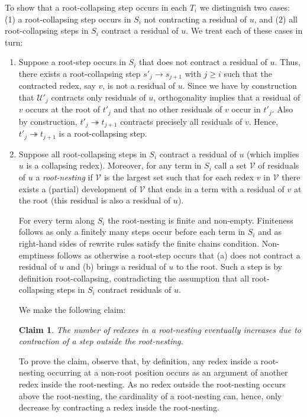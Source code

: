 \documentclass{LMCS}
\theoremstyle{plain}
\newtheorem{claim}{Claim}
\theoremstyle{definition}
\newcommand{\rew}{\rightarrow}
\newcommand{\trewt}{\twoheadrightarrow}
\begin{document}
To show that a root-collapsing step occurs in each $T_i$ we distinguish
two cases: (1) a root-collapsing step occurs in $S_i$ not
contracting a residual of $u$, and (2) all root-collapsing steps in $S_i$
contract a residual of $u$. We treat each of these cases in turn:
\begin{enumerate}[(1)]
\item
Suppose a root-step occurs in $S_i$ that does not contract a residual of $u$. Thus, there exists a root-collapsing step $s'_j \rew s_{j + 1}$ with $j \geq i$ such that the contracted redex, say $v$, is not a residual of $u$. Since we have by construction that $\mathcal{U}'_j$ contracts only residuals of $u$, orthogonality implies that a residual of $v$ occurs at the root of $t'_j$ and that no other residuals of $v$ occur in $t'_j$. Also by construction, $t'_j \trewt t_{j + 1}$ contracts precisely all residuals of $v$. Hence, $t'_j \trewt t_{j + 1}$ is a root-collapsing step.
\item
Suppose all root-collapsing steps in $S_i$ contract a residual of $u$ (which implies $u$ is a collapsing redex). Moreover, for any term in $S_i$ call a set $\mathcal{V}$ of residuals of $u$ a \emph{root-nesting} if $\mathcal{V}$ is the largest set such that for each redex $v$ in $\mathcal{V}$ there exists a (partial) development of $\mathcal{V}$ that ends in a term with a residual of $v$ at the root (this residual is also a residual of $u$).

For every term along $S_i$ the root-nesting is finite and non-empty. Finiteness follows as only a finitely many steps occur before each term in $S_i$ and as right-hand sides of rewrite rules satisfy the finite chains condition. Non-emptiness follows as otherwise a root-step occurs that (a) does not contract a residual of $u$ and (b) brings a residual of $u$ to the root. Such a step is by definition root-collapsing, contradicting the assumption that all root-collapsing steps in $S_i$ contract residuals of $u$.

We make the following claim:
\begin{claim}
The number of redexes in a root-nesting eventually increases due to contraction of a step outside the root-nesting.
\end{claim}

To prove the claim, observe that, by definition,
any redex inside a root-nesting occurring at a non-root position occurs
as an argument of another redex inside the root-nesting. As no redex outside the root-nesting occurs above the root-nesting, the cardinality of a root-nesting can, hence, only decrease by contracting a redex inside the root-nesting.


\end{enumerate}
\end{document}
